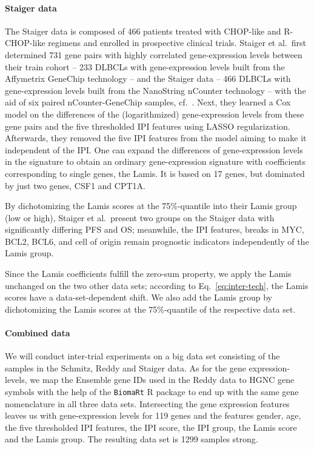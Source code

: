 \paragraph{Staiger data}

The Staiger data is composed of \num{466} patients treated with CHOP-like and R-CHOP-like regimens 
and enrolled in prospective clinical trials. 
Staiger et al.\ first determined \num{731} gene pairs with highly correlated gene-expression levels 
between their train cohort -- \num{233} DLBCLs with gene-expression levels built from the Affymetrix 
GeneChip technology -- and the Staiger data -- \num{466} DLBCLs with gene-expression levels built 
from the NanoString nCounter technology -- with the aid of six paired nCounter-GeneChip samples, cf.\ 
\cite[Supplementary Methods]{staiger20}.
Next, they learned a Cox model on the differences of the (logarithmized) gene-expression levels 
from these gene pairs and the five thresholded IPI features using LASSO regularization. 
Afterwards, they removed the five IPI features from the model aiming to make it independent of the 
IPI. One can expand the differences of gene-expression levels in the signature to obtain an ordinary 
gene-expression signature with coefficients corresponding to single genes, the Lamis. It is 
based on \num{17} genes, but dominated by just two genes, CSF1 and CPT1A. 

By dichotomizing the 
Lamis scores at the 75\%-quantile into their Lamis group (low or high), Staiger et al.\ present two 
groups on the Staiger data with significantly differing PFS and OS; 
meanwhile, the IPI features, breaks in MYC, BCL2, BCL6, and cell of origin remain prognostic 
indicators independently of the Lamis group.

Since the Lamis coefficients fulfill the 
zero-sum property, we apply the Lamis unchanged on the two other data sets; according to Eq.\ 
\eqref{eq:inter-tech}, the Lamis scores have a data-set-dependent shift. We also add the Lamis 
group by dichotomizing the Lamis scores at the 75\%-quantile of the respective data set.

\paragraph{Combined data}

We will conduct inter-trial experiments on a big data set consisting of the samples in the Schmitz, 
Reddy and Staiger data. As for the gene expression-levels, we map the Ensemble gene IDs used 
in the Reddy data to HGNC gene symbols with the help of the \texttt{BiomaRt} R package \cite{biomart}
to end up with the same gene nomenclature in all three data sets. Intersecting the gene expression 
features leaves us with gene-expression levels for \num{119} genes and the features gender, age, 
the five thresholded IPI features, the IPI score, the IPI group, the Lamis score and the Lamis 
group. The resulting data set is \num{1299} samples strong.

